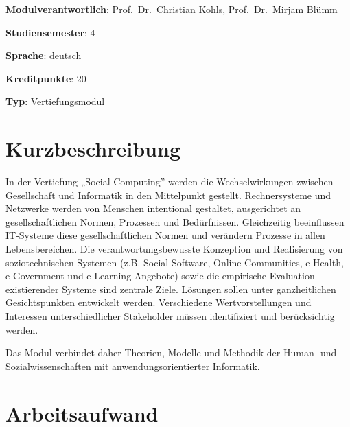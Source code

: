 \begin{modulHead}
\textbf{Modulverantwortlich}: Prof.~Dr.~Christian
Kohls, Prof.~Dr.~Mirjam
Blümm
\end{modulHead}
\begin{modulHead}
\textbf{Studiensemester}:
4
\end{modulHead}
\begin{modulHead}
\textbf{Sprache}:
deutsch
\end{modulHead}
\begin{modulHead}
\textbf{Kreditpunkte}:
20
\end{modulHead}
\begin{modulHead}
\textbf{Typ}:
Vertiefungsmodul
\end{modulHead}


\hypertarget{kurzbeschreibungpathlabelmi-2017modulbeschreibungen-bachelorba_vertiefung_socialcomputing}{%
\section*{Kurzbeschreibung\label{/mi-2017/modulbeschreibungen-bachelor/BA_Vertiefung_SocialComputing}}\label{kurzbeschreibungpathlabelmi-2017modulbeschreibungen-bachelorba_vertiefung_socialcomputing}}

In der Vertiefung „Social Computing'' werden die Wechselwirkungen
zwischen Gesellschaft und Informatik in den Mittelpunkt gestellt.
Rechnersysteme und Netzwerke werden von Menschen intentional gestaltet,
ausgerichtet an gesellschaftlichen Normen, Prozessen und Bedürfnissen.
Gleichzeitig beeinflussen IT-Systeme diese gesellschaftlichen Normen und
verändern Prozesse in allen Lebensbereichen. Die verantwortungsbewusste
Konzeption und Realisierung von soziotechnischen Systemen (z.B. Social
Software, Online Communities, e-Health, e-Government und e-Learning
Angebote) sowie die empirische Evaluation existierender Systeme sind
zentrale Ziele. Lösungen sollen unter ganzheitlichen Gesichtspunkten
entwickelt werden. Verschiedene Wertvorstellungen und Interessen
unterschiedlicher Stakeholder müssen identifiziert und berücksichtig
werden.

Das Modul verbindet daher Theorien, Modelle und Methodik der Human- und
Sozialwissenschaften mit anwendungsorientierter Informatik.

\hypertarget{arbeitsaufwandpathlabelmi-2017modulbeschreibungen-bachelorba_vertiefung_socialcomputing}{%
\section*{Arbeitsaufwand\label{/mi-2017/modulbeschreibungen-bachelor/BA_Vertiefung_SocialComputing}}\label{arbeitsaufwandpathlabelmi-2017modulbeschreibungen-bachelorba_vertiefung_socialcomputing}}

